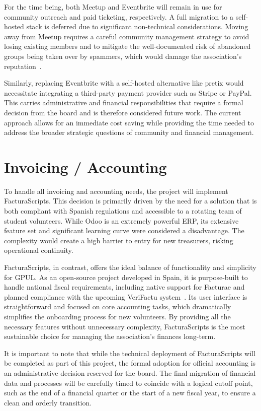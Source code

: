 For the time being, both Meetup and Eventbrite will remain in use for community outreach and paid ticketing, respectively. A full migration to a self-hosted stack is deferred due to significant non-technical considerations. Moving away from Meetup requires a careful community management strategy to avoid losing existing members and to mitigate the well-documented risk of abandoned groups being taken over by spammers, which would damage the association's reputation~\cite{combuilders-meetup-takeover}.

Similarly, replacing Eventbrite with a self-hosted alternative like pretix would necessitate integrating a third-party payment provider such as Stripe or PayPal. This carries administrative and financial responsibilities that require a formal decision from the board and is therefore considered future work. The current approach allows for an immediate cost saving while providing the time needed to address the broader strategic questions of community and financial management.

\section{Invoicing / Accounting}

To handle all invoicing and accounting needs, the project will implement FacturaScripts. This decision is primarily driven by the need for a solution that is both compliant with Spanish regulations and accessible to a rotating team of student volunteers. While Odoo is an extremely powerful ERP, its extensive feature set and significant learning curve were considered a disadvantage. The complexity would create a high barrier to entry for new treasurers, risking operational continuity.

FacturaScripts, in contrast, offers the ideal balance of functionality and simplicity for GPUL. As an open-source project developed in Spain, it is purpose-built to handle national fiscal requirements, including native support for Facturae and planned compliance with the upcoming VeriFactu system~\cite{FacturaScriptsAntifraude}. Its user interface is straightforward and focused on core accounting tasks, which dramatically simplifies the onboarding process for new volunteers. By providing all the necessary features without unnecessary complexity, FacturaScripts is the most sustainable choice for managing the association's finances long-term.

It is important to note that while the technical deployment of FacturaScripts will be completed as part of this project, the formal adoption for official accounting is an administrative decision reserved for the board. The final migration of financial data and processes will be carefully timed to coincide with a logical cutoff point, such as the end of a financial quarter or the start of a new fiscal year, to ensure a clean and orderly transition.

